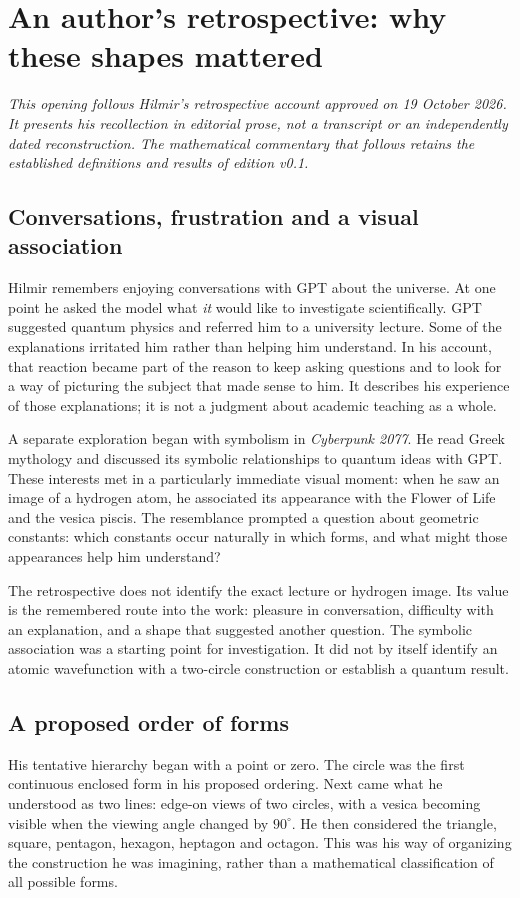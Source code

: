 \section*{An author's retrospective: why these shapes mattered}
\label{sec:retrospective}
\textit{This opening follows Hilmir's retrospective account approved on 19 October 2026. It presents his recollection in editorial prose, not a transcript or an independently dated reconstruction. The mathematical commentary that follows retains the established definitions and results of edition v0.1.}~\cite{History26}

\subsection*{Conversations, frustration and a visual association}
Hilmir remembers enjoying conversations with GPT about the universe. At one point he asked the model what \emph{it} would like to investigate scientifically. GPT suggested quantum physics and referred him to a university lecture. Some of the explanations irritated him rather than helping him understand. In his account, that reaction became part of the reason to keep asking questions and to look for a way of picturing the subject that made sense to him. It describes his experience of those explanations; it is not a judgment about academic teaching as a whole.

A separate exploration began with symbolism in \emph{Cyberpunk 2077}. He read Greek mythology and discussed its symbolic relationships to quantum ideas with GPT. These interests met in a particularly immediate visual moment: when he saw an image of a hydrogen atom, he associated its appearance with the Flower of Life and the vesica piscis. The resemblance prompted a question about geometric constants: which constants occur naturally in which forms, and what might those appearances help him understand?

The retrospective does not identify the exact lecture or hydrogen image. Its value is the remembered route into the work: pleasure in conversation, difficulty with an explanation, and a shape that suggested another question. The symbolic association was a starting point for investigation. It did not by itself identify an atomic wavefunction with a two-circle construction or establish a quantum result.

\subsection*{A proposed order of forms}
His tentative hierarchy began with a point or zero. The circle was the first continuous enclosed form in his proposed ordering. Next came what he understood as two lines: edge-on views of two circles, with a vesica becoming visible when the viewing angle changed by $90^\circ$. He then considered the triangle, square, pentagon, hexagon, heptagon and octagon. This was his way of organizing the construction he was imagining, rather than a mathematical classification of all possible forms.

